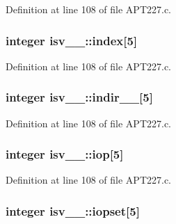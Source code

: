 Definition at line 108 of file A\+P\+T227.\+c.

\subsubsection[{\texorpdfstring{index}{index}}]{\setlength{\rightskip}{0pt plus 5cm}integer isv\+\_\+\_\+\+::index\mbox{[}5\mbox{]}}\hypertarget{structisv__1___a204b23597107883203d7e9440f6a2842}{}\label{structisv__1___a204b23597107883203d7e9440f6a2842}


Definition at line 108 of file A\+P\+T227.\+c.

\subsubsection[{\texorpdfstring{indir\+\_\+\+\_\+}{indir__}}]{\setlength{\rightskip}{0pt plus 5cm}integer isv\+\_\+\_\+\+::indir\+\_\+\+\_\+\mbox{[}5\mbox{]}}\hypertarget{structisv__1___a94fbd525d54bdfb30be1d9e07ee60ee7}{}\label{structisv__1___a94fbd525d54bdfb30be1d9e07ee60ee7}


Definition at line 108 of file A\+P\+T227.\+c.

\subsubsection[{\texorpdfstring{iop}{iop}}]{\setlength{\rightskip}{0pt plus 5cm}integer isv\+\_\+\_\+\+::iop\mbox{[}5\mbox{]}}\hypertarget{structisv__1___a6f46521e28e3eadcb479e385590fc1a6}{}\label{structisv__1___a6f46521e28e3eadcb479e385590fc1a6}


Definition at line 108 of file A\+P\+T227.\+c.

\subsubsection[{\texorpdfstring{iopset}{iopset}}]{\setlength{\rightskip}{0pt plus 5cm}integer isv\+\_\+\_\+\+::iopset\mbox{[}5\mbox{]}}\hypertarget{structisv__1___a9e20320344cbbf667a8c970a9ba05eab}{}\label{structisv__1___a9e20320344cbbf667a8c970a9ba05eab}



